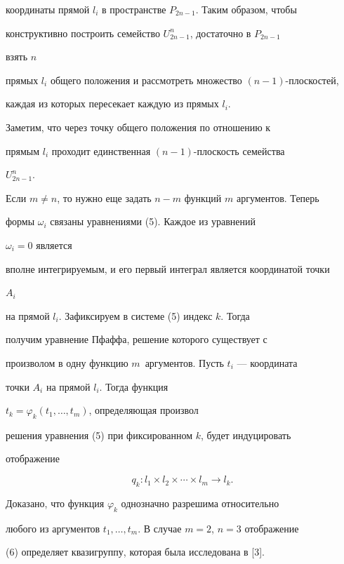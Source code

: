 координаты прямой $l_i$ в пространстве $P_{2n-1}$. Таким образом, чтобы 


конструктивно построить семейство $U^n_{2n-1}$, достаточно в $P_{2n-1}$ 


взять $n$ 


прямых $l_i$ общего положения и рассмотреть множество $(n-1)$-плоскостей, 


каждая из которых пересекает каждую из прямых $l_i$. 


Заметим, что через точку общего положения по отношению к 


прямым $l_i$ проходит единственная $(n-1)$-плоскость семейства 


$U^n_{2n-1}$. 


 


Если $m\ne n$, то нужно еще задать $n-m$ функций $m$ аргументов. Теперь 


формы $\omega_i$ связаны уравнениями (5). Каждое из уравнений 


$\omega_i=0$ является 


вполне интегрируемым, и его первый интеграл является координатой точки 


$A_i$ 


на прямой $l_i$. Зафиксируем в системе (5) индекс $k$. Тогда 


получим уравнение Пфаффа, решение которого существует с 


произволом в одну функцию $m$~аргументов. Пусть $t_i$ --- координата 


точки $A_i$ на прямой $l_i$. Тогда функция 


$t_k=\varphi_k(t_1,\dotsc,t_m)$, определяющая произвол 


решения уравнения (5) при фиксированном $k$, будет индуцировать 


отображение 


\begin{equation} 


q_k:l_1\times l_2\times\dotsb\times l_m\to l_k. 


\end{equation} 


Доказано, что функция $\varphi_k$ однозначно разрешима относительно 


любого из аргументов $t_1,\dotsc,t_m$. В случае $m=2$, $n=3$ отображение 


(6) определяет квазигруппу, которая была исследована в [3]. 


\medskip 


